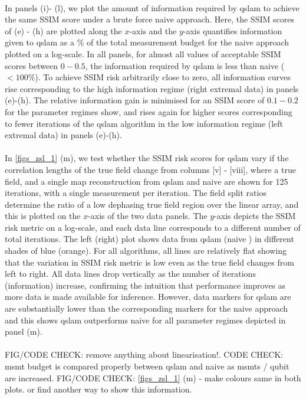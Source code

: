 \\
In panels (i)- (l), we plot the amount of information required by qslam to achieve the same SSIM score under a brute force naive approach. Here,  the SSIM scores of (e) - (h) are plotted along the $x$-axis and the $y$-axis quantifies information given to qslam as a \% of the total measurement budget for the naive approach plotted on a log-scale. In all panels, for almost all values of acceptable SSIM scores between $0-0.5$, the information required by qslam is less than naive ($< 100\%$). To achieve SSIM risk arbitrarily close to zero, all information curves rise  corresponding to the high information regime (right extremal data) in panels (e)-(h). The relative information gain is minimised for an SSIM score of $0.1-0.2$ for the parameter regimes show, and rises again for higher scores corresponding to fewer iterations of the qslam algorithm in the low information regime (left extremal data) in panels (e)-(h).\\
\\
In \cref{figs_zsl_1} (m), we test whether the SSIM risk scores for qslam vary if the correlation lengths of the true field change from columns [v] - [viii], where a true field, and a single map reconstruction from qslam and naive are shown for 125 iterations, with a single measurement per iteration. The field split ratios determine the ratio of a low dephasing true field region over the linear array, and this is plotted on the $x$-axis of the two data panels. The $y$-axis depicts the SSIM risk metric on a log-scale, and each data line corresponds to a different number of total iterations. The left (right) plot shows data from qslam (naive ) in different shades of blue (orange). For all algorithms, all lines are relatively flat showing that the variation in SSIM risk metric is low even as the true field changes from left to right. All data lines drop vertically as the number of iterations (information) increase, confirming the intuition that performance improves as more data is made available for inference. However, data markers for qslam are  are substantially lower than the corresponding markers for the naive approach and this shows qslam outperforms naive for all parameter regimes depicted in panel (m).\\
\\
FIG/CODE CHECK: remove anything about linearisation!. 
CODE CHECK: msmt budget is compared properly between qslam and naive as msmts / qubit are increased.
FIG/CODE CHECK: \cref{figs_zsl_1} (m) - make colours same in both plots. or find another way to show this information. \\

